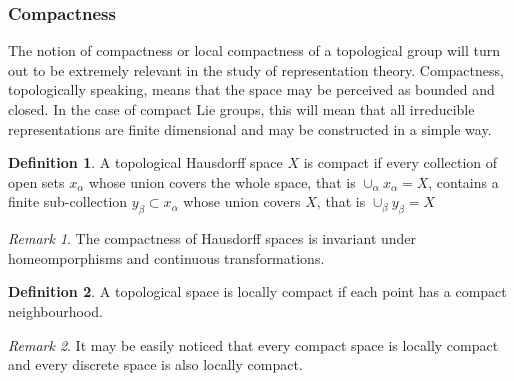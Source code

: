 \documentclass[12pt,a4paper]{report}
\theoremstyle{definition}
\newtheorem{definition}{Definition}
\theoremstyle{remark}
\newtheorem*{remark}{Remark}
\theoremstyle{remark}
\begin{document}
\subsubsection{Compactness}
The notion of compactness or local compactness of a topological group will turn out to be extremely relevant in the study of representation theory. Compactness, topologically speaking, means that the space may be perceived as bounded and closed. In the case of compact Lie groups, this will mean that all irreducible representations are finite dimensional and may be constructed in a simple way.
\begin{definition}
A topological Hausdorff space $X$ is compact if every collection of open sets $x_\alpha$ whose union covers the whole space, that is $\cup_\alpha x_\alpha=X$, contains a finite sub-collection $y_\beta\subset x_\alpha$ whose union covers $X$, that is $\cup_\beta y_\beta=X$
\end{definition}
\begin{remark}
The compactness of Hausdorff spaces is invariant under homeomporphisms and continuous transformations. 
\end{remark}
\begin{definition}
A topological space is locally compact if each point has a compact neighbourhood.
\end{definition}
\begin{remark}
It may be easily noticed that every compact space is locally compact and every discrete space is also locally compact.
\end{remark}
\end{document}
